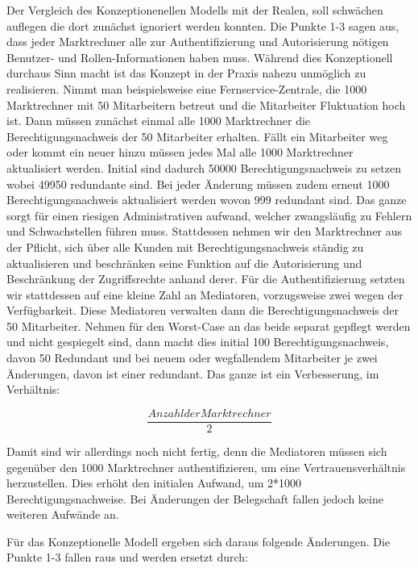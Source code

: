 \documentclass[11pt,a4paper]{report}
\begin{document}
Der Vergleich des Konzeptionenellen Modells mit der Realen, soll schwächen auflegen die dort zunächst ignoriert werden konnten. Die Punkte 1-3 sagen aus, dass jeder Marktrechner alle zur Authentifizierung und Autorisierung nötigen Benutzer- und Rollen-Informationen haben muss. Während dies Konzeptionell durchaus Sinn macht ist das Konzept in der Praxis nahezu unmöglich zu realisieren. Nimmt man beispielsweise eine Fernservice-Zentrale, die 1000 Marktrechner mit 50 Mitarbeitern betreut und die Mitarbeiter Fluktuation hoch ist. Dann müssen zunächst einmal alle 1000 Marktrechner die Berechtigungsnachweis der 50 Mitarbeiter erhalten. Fällt ein Mitarbeiter weg oder kommt ein neuer hinzu müssen jedes Mal alle 1000 Marktrechner aktualisiert werden. Initial sind dadurch 50000 Berechtigungsnachweis zu setzen wobei 49950 redundante sind. Bei jeder Änderung müssen zudem erneut 1000 Berechtigungsnachweis aktualisiert werden wovon 999 redundant sind. Das ganze sorgt für einen riesigen Administrativen aufwand, welcher zwangsläufig zu Fehlern und Schwachstellen führen muss. Stattdessen nehmen wir den Marktrechner aus der Pflicht, sich über alle Kunden mit Berechtigungsnachweis ständig zu aktualisieren und beschränken seine Funktion auf die Autorisierung und Beschränkung der Zugriffsrechte anhand derer. Für die Authentifizierung setzten wir stattdessen auf eine kleine Zahl an Mediatoren, vorzugsweise zwei wegen der Verfügbarkeit. Diese Mediatoren verwalten dann die Berechtigungsnachweis der 50 Mitarbeiter. Nehmen für den Worst-Case an das beide separat gepflegt werden und nicht gespiegelt sind, dann macht dies initial 100 Berechtigungsnachweis, davon 50 Redundant und bei neuem oder wegfallendem Mitarbeiter je zwei Änderungen, davon ist einer redundant. Das ganze ist ein Verbesserung, im Verhältnis:

\[\frac{Anzahl der Marktrechner}{2}\]
 
Damit sind wir allerdings noch nicht fertig, denn die Mediatoren müssen sich gegenüber den 1000 Marktrechner authentifizieren, um eine Vertrauensverhältnis herzustellen. Dies erhöht den initialen Aufwand, um 2*1000 Berechtigungsnachweise. Bei Änderungen der Belegschaft fallen jedoch keine weiteren Aufwände an.

Für das Konzeptionelle Modell ergeben sich daraus folgende Änderungen. Die Punkte 1-3 fallen raus und werden ersetzt durch:
\end{document}
